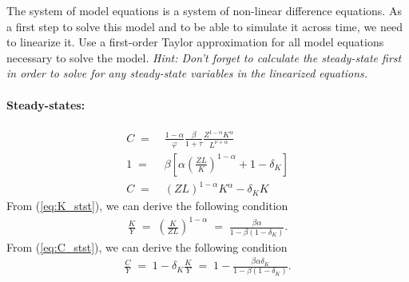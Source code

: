\documentclass[a4paper, 12pt]{article}
\begin{document}
\newpage%
\begin{Exercise}[title={Linearizing the System of Model Equations},label=ex_1]%
	The system of model equations is a system of non-linear difference equations. As a first step to solve this model and to be able to simulate it across time, we need to linearize it. Use a first-order Taylor approximation for all model equations necessary to solve the model. \textit{Hint: Don't forget to calculate the steady-state first in order to solve for any steady-state variables in the linearized equations.}%
\end{Exercise}%
\bigskip%
\begin{Answer}%
	\begin{small}%
		\paragraph{Steady-states:}%
		\begin{align}%
			C \; = & \; \frac{1-\alpha}{\varphi} \frac{\beta}{1+\tau} \frac{Z^{1-\alpha} K^\alpha}{L^{\nu+\alpha}}\label{eq:L_stst}\\%
			1 \; = & \; \beta \left[ \alpha \left(\frac{Z L}{K}\right)^{1-\alpha} + 1 - \delta_K \right]\label{eq:K_stst}\\%
			C \; = & \; \left(Z L\right)^{1-\alpha} K^\alpha - \delta_K K\label{eq:C_stst}%
		\end{align}%
		From (\ref{eq:K_stst}), we can derive the following condition%
		\begin{align}%
			\frac{K}{Y} \; = \; \left( \frac{K}{Z L} \right)^{1-\alpha} \; = \; \frac{\beta \alpha}{1-\beta(1-\delta_K)}.%
		\end{align}%
		From (\ref{eq:C_stst}), we can derive the following condition%
		\begin{align}%
			\frac{C}{Y} \; = \; 1 - \delta_K \frac{K}{Y} \; = \; 1 - \frac{\beta \alpha \delta_K}{1-\beta(1-\delta_K)}.%
		\end{align}%

\end{small}
\end{Answer}
\end{document}
